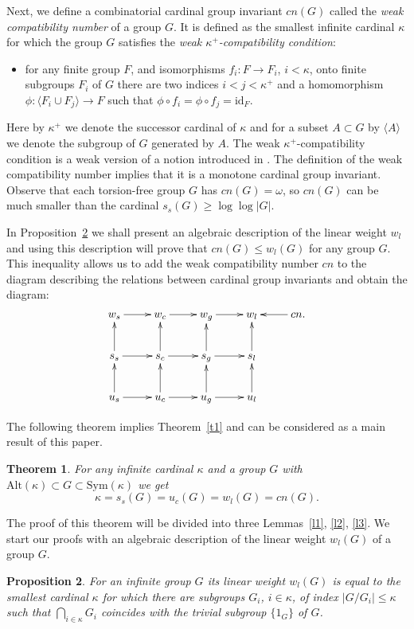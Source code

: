 \documentclass[11pt, twoside]{amsart}
\newtheorem{theorem}{Theorem}
\newtheorem{proposition}[theorem]{Proposition}
\theoremstyle{definition}
\begin{document}
Next, we define a combinatorial cardinal group invariant ${cn}(G)$ called the {\em weak compatibility number} of a group $G$. It is defined as the smallest infinite cardinal $\kappa$ for which the group $G$ satisfies the {\em weak $\kappa^+$-compatibility condition}:
\begin{itemize}
\item  for any finite group $F$, and isomorphisms $f_i:F\to F_i$, $i<\kappa$, onto finite subgroups $F_i$ of $G$ there are two indices $i<j<\kappa^+$ and a homomorphism $\phi:\langle F_i\cup F_j\rangle\to F$ such that $\phi\circ f_i=\phi\circ f_j={\mathrm{id}}_F$.
\end{itemize}
Here by $\kappa^+$ we denote the successor cardinal of $\kappa$ and for a subset $A\subset G$ by $\langle A\rangle$ we denote the subgroup of $G$ generated by $A$. The weak $\kappa^+$-compatibility condition is a weak version of a notion introduced in \cite[Def. 1.9]{JST}. The definition of the weak compatibility number implies that it is a monotone cardinal group invariant. Observe that each torsion-free group $G$ has ${cn}(G)={\omega}$, so ${cn}(G)$ can be much smaller than the cardinal $s_s(G)\ge \log\log|G|$.

In Proposition~\ref{p:lw-char} we shall present an algebraic description of the linear weight $w_l$ and using this description will prove that ${cn}(G)\le w_l(G)$ for any group $G$. This inequality allows us to add the weak compatibility number ${cn}$ to the diagram describing the relations between cardinal group invariants and obtain the diagram:
$$
\xymatrix{
w_s\ar[r]&w_c\ar[r]&w_g\ar[r]&w_l&{cn}.\ar[l]\\
s_s\ar[r]\ar[u]&s_c\ar[r]\ar[u]&s_g\ar[r]\ar[u]&s_l\ar[u]\\
u_s\ar[r]\ar[u]&u_c\ar[r]\ar[u]&u_g\ar[r]\ar[u]&u_l\ar[u]
}
$$

The following theorem implies Theorem~\ref{t1} and can be considered as a main result of this paper.

\begin{theorem}\label{main} For any infinite cardinal $\kappa$ and a group $G$ with ${\mathrm{Alt}}(\kappa)\subset G\subset {\mathrm{Sym}}(\kappa)$ we get $$\kappa=s_s(G)=u_c(G)=w_l(G)={cn}(G).$$
\end{theorem}

The proof of this theorem will be divided into three Lemmas~\ref{l1}, \ref{l2}, \ref{l3}. We start our proofs with an algebraic description of the linear weight $w_l(G)$ of a group $G$.

\begin{proposition}\label{p:lw-char} For an infinite group $G$ its linear weight $w_l(G)$ is equal to the smallest cardinal $\kappa$ for which there are subgroups $G_i$, $i\in\kappa$, of index $|G/G_i|\le\kappa$ such that $\bigcap_{i\in\kappa}G_i$ coincides with the trivial subgroup $\{1_G\}$ of $G$.
\end{proposition}
\end{document}

